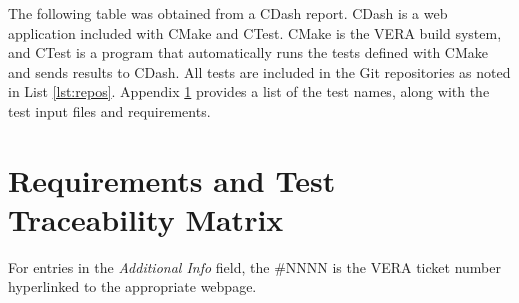\documentclass{vera-ornltm}
\begin{document}
The following table was obtained from a CDash report.
CDash is a web application included with CMake and CTest.
CMake is the VERA build system, and CTest is a program that automatically runs the tests defined with CMake and sends results to CDash.
All tests are included in the Git repositories as noted in List \ref{lst:repos}.
Appendix \ref{sec:A2} provides a list of the test names, along with the test input files and requirements.

\clearpage
    
\section{Requirements and Test Traceability Matrix}
\label{sec:A2}

For entries in the \textit{Additional Info} field, the \#NNNN is the VERA ticket number hyperlinked to the appropriate webpage.


\end{document}
